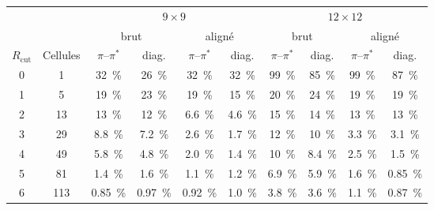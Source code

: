 \begin{tabular}{c c cc cc cc cc}
    \hline\hline
    & & \multicolumn{4}{c}{$9\times9$} & \multicolumn{4}{c}{$12\times12$} \\
    \cline{3-6}\cline{7-10}
    & & \multicolumn{2}{c}{brut} & \multicolumn{2}{c}{aligné} & \multicolumn{2}{c}{brut} & \multicolumn{2}{c}{aligné} \\
    $R_\text{cut}$ & Cellules & $\pi$--$\pi^*$ & diag. & $\pi$--$\pi^*$ & diag. & $\pi$--$\pi^*$ & diag. & $\pi$--$\pi^*$ & diag. \\
    \hline
    0 & 1   & 32~\%   & 26~\%   & 32~\%   & 32~\%  & 99~\%  & 85~\%  & 99~\%  & 87~\% \\
    1 & 5   & 19~\%   & 23~\%   & 19~\%   & 15~\%  & 20~\%  & 24~\%  & 19~\%  & 19~\% \\
    2 & 13  & 13~\%   & 12~\%   & 6.6~\%  & 4.6~\% & 15~\%  & 14~\%  & 13~\%  & 13~\% \\
    3 & 29  & 8.8~\%  & 7.2~\%  & 2.6~\%  & 1.7~\% & 12~\%  & 10~\%  & 3.3~\% & 3.1~\% \\
    4 & 49  & 5.8~\%  & 4.8~\%  & 2.0~\%  & 1.4~\% & 10~\%  & 8.4~\% & 2.5~\% & 1.5~\% \\
    5 & 81  & 1.4~\%  & 1.6~\%  & 1.1~\%  & 1.2~\% & 6.9~\% & 5.9~\% & 1.6~\% & 0.85~\% \\
    6 & 113 & 0.85~\% & 0.97~\% & 0.92~\% & 1.0~\% & 3.8~\% & 3.6~\% & 1.1~\% & 0.87~\% \\
    \hline\hline
\end{tabular}
